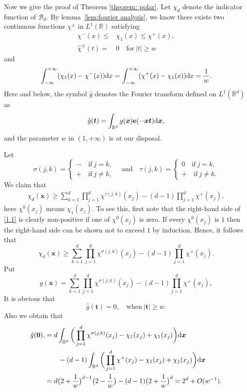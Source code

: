 \documentclass[12pt, reqno, twoside, letterpaper]{amsart}
\numberwithin{equation}{section}
\newcommand{\cB}{\ensuremath{\mathcal{B}}}
\newcommand{\RR}{\ensuremath{\mathbb{R}}}
\theoremstyle{customthm}
\theoremstyle{customrem}
\def\int{\intop\nolimits}
\begin{document}
Now we give the proof of Theorem \ref{theorem: polar}. Let $\chi_d$ denote the indicator function of $\cB_d$. By lemma~\ref{lem:fourier analysis}, we know there exists two continuous functions $\chi^{\pm}$ in $L^1(\RR)$ satisfying
\begin{align*}
	\chi^-(x) \leqslant &\chi_1(x) \leqslant \chi^+(x), \\
	\hat{\chi}^{\pm}(t)=&0 \quad \text{for}\ |t|\geqslant w
\end{align*}
and
$$
\int_{-\infty}^{+\infty}(\chi_1(x)-\chi^-(x))\textup{d}x
=   \int_{-\infty}^{+\infty}(\chi^+(x)-\chi_1(x))\textup{d}x = \frac{1}{w}.
$$
Here and below, the symbol $\hat{g}$ denotes the Fourier transform defined on
$L^{1}(\mathbb{R}^d)$ as
$$
\hat{g}(\boldsymbol{t})=\int_{\mathbb{R}^d}g(\boldsymbol{x})\mathbf{e}(-\boldsymbol{xt})
\textup{d}\boldsymbol{x},
$$
and the parameter $w$ in $(1,+\infty)$ is at our disposal.


Let
$$
\sigma(j,k) = \left\{
\begin{aligned}
	- \quad \text{if}\ j=k, \\
	+ \quad \text{if}\ j\neq k,
\end{aligned}\right. \quad \text{and} \quad
\tau(j,k) = \left\{
\begin{aligned}
	0 \quad \text{if}\ j=k, \\
	+ \quad \text{if}\ j\neq k.
\end{aligned}\right.
$$
We claim that
\begin{align}
	\label{1.1}
	\chi_d(\boldsymbol{x}) \geqslant \sum_{k=1}^{d}\prod_{j=1}^{d}\chi^{\tau(j,k)}(x_j) - (d-1)\prod_{j=1}^{d}\chi^+(x_j),
\end{align}
here $\chi^0(x_j)$ means $\chi_1(x_j)$. To see this, first note that the right-hand side of \eqref{1.1} is clearly non-positive if one of $\chi^0(x_j)$ is zero. If every $\chi^0(x_j)$ is $1$ then the right-hand side can be shown not to exceed $1$ by induction. Hence, it follows that
$$
\chi_d(\boldsymbol{x}) \geqslant \sum_{k=1}^{d}\prod_{j=1}^{d}\chi^{\sigma(j,k)}(x_j) - (d-1)\prod_{j=1}^{d}\chi^+(x_j).
$$
Put
$$
g(\boldsymbol{x}) = \sum_{k=1}^{d}\prod_{j=1}^{d}\chi^{\sigma(j,k)}(x_j) - (d-1)\prod_{j=1}^{d}\chi^+(x_j),
$$
It is obvious that
$$
\hat{g}(\boldsymbol{t}) = 0, \quad \text{when}\ |\boldsymbol{t}|\geqslant w.
$$
Also we obtain that
\begin{align*}
	\hat{g}(\boldsymbol{0}),&=d\int_{\RR^d} \bigg( \prod_{j=1}^{d}\chi^{\sigma(j,k)}(x_j) - \chi_1(x_j) + \chi_1(x_j) \bigg)
	\textup{d}\boldsymbol{x} \\
	&\qquad - (d-1)\int_{\RR^d} \bigg( \prod_{j=1}^{d}\chi^{+}(x_j) - \chi_1(x_j) + \chi_1(x_j) \bigg)
	\textup{d}\boldsymbol{x} \\
	&=d\big(2+\frac{1}{w}\big)^{d-1}\big(2-\frac{1}{w}\big) - (d-1)\big( 2+\frac{1}{w} \big)^{d} = 2^d + O(w^{-1}).
\end{align*}
\end{document}
